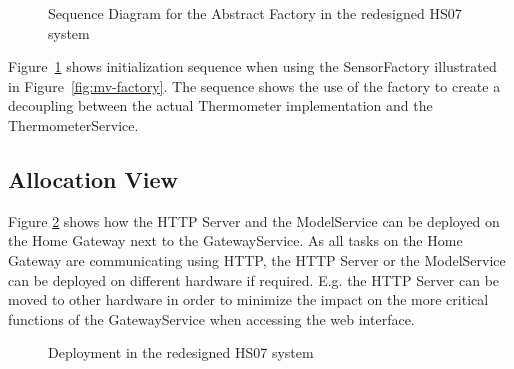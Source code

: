 \documentclass[a4paper,10pt]{article}
\begin{document}
\begin{figure}[!htb]
\centerline{}
\caption{Sequence Diagram for the Abstract Factory in the redesigned HS07 system}
\label{fig:seq-tfac}
\end{figure}
Figure~\ref{fig:seq-tfac} shows initialization sequence when using the SensorFactory illustrated in Figure~\ref{fig:mv-factory}. The sequence shows the use of the factory to create a decoupling between the actual Thermometer implementation and the ThermometerService.

\subsection{Allocation View}

Figure \ref{fig:deployment} shows how the HTTP Server and the ModelService can be deployed on the Home Gateway next to the GatewayService. As all tasks on the Home Gateway are communicating using HTTP, the HTTP Server or the ModelService can be deployed on different hardware if required. E.g. the HTTP Server can be moved to other hardware in order to minimize the impact on the more critical functions of the GatewayService when accessing the web interface.

\begin{figure}[!htb]
\centerline{}
\caption{Deployment in the redesigned HS07 system}
\label{fig:deployment}
\end{figure}

\clearpage




\end{document}

